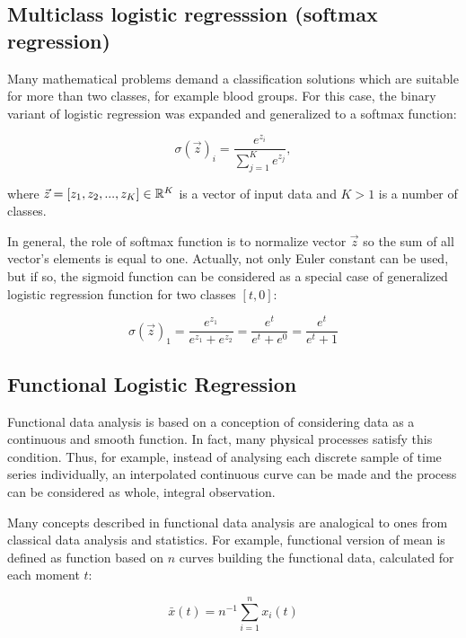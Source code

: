 \documentclass[energies,article,submit,pdftex,moreauthors]{Definitions/mdpi}
\begin{document}
\vspace{5mm}
\subsection{Multiclass logistic regresssion (softmax regression) }

Many mathematical problems demand a classification solutions which are suitable for more than two classes, for example blood groups. For this case, the binary variant of logistic regression was expanded and generalized to a softmax function:
\begin{linenomath}
\begin{equation}
\sigma(\vec{z})_i = \frac{e^{z_i}}{\sum_{j=1}^{K} e^{z_j}},
\end{equation}
\end{linenomath}
where $\vec{z} = [z_1, z_2, ..., z_K] \in {\Bbb R}^K$ is a vector of input data and $ K > 1 $ is a number of classes.

In general, the role of softmax function is to normalize vector $\vec{z}$ so the sum of all vector's elements is equal to one. Actually, not only Euler constant can be used, but if so, the sigmoid function can be considered as a special case of generalized logistic regression function for two classes $[t, 0]$:
\begin{linenomath}
\begin{equation}
\sigma(\vec{z})_1 = \frac{e^{z_1}}{e^{z_1}+e^{z_2}} = \frac{e^{t}}{e^{t}+e^{0}} = \frac{e^{t}}{e^{t}+1}
\end{equation}
\end{linenomath}


\subsection{Functional Logistic Regression}

Functional data analysis is based on a conception of considering data as a continuous and smooth function. In fact, many physical processes satisfy this condition. Thus, for example, instead of analysing each discrete sample of time series individually, an interpolated continuous curve can be made and the process can be considered as whole, integral observation.

Many concepts described in functional data analysis are analogical to ones from classical data analysis and statistics. For example, functional version of mean is defined as function based on $ n $ curves building the functional data, calculated for each moment $ t $:
\begin{linenomath}
\begin{equation}
\bar{x}(t) = n^{-1} \sum_{i=1}^{n} x_i (t)
\end{equation}
\end{linenomath}
\end{document}
